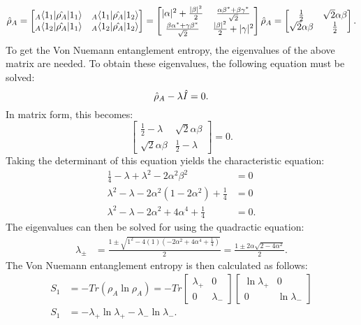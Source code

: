 \begin{equation}
\hat{\rho}_A = \begin{bmatrix} {}_A \langle 1_1 | \hat{\rho_A} | 1_1 \rangle & {}_A \langle 1_1 | \hat{\rho_A} | 1_2 \rangle \\ {}_A \langle 1_2 | \hat{\rho_A} | 1_1 \rangle & {}_A \langle 1_2 | \hat{\rho_A} | 1_2 \rangle \end{bmatrix} = \begin{bmatrix} |\alpha|^2 + \frac{|\beta|^2}{2} & \frac{\alpha \beta^* + \beta \gamma^*}{\sqrt{2}} \\ \frac{\beta \alpha^* + \gamma \beta^*}{\sqrt{2}} & \frac{|\beta|^2}{2} + |\gamma|^2 \end{bmatrix} \\
\hat{\rho}_A = \begin{bmatrix} \frac{1}{2} & \sqrt{2} \alpha \beta \\ \sqrt{2} \alpha \beta & \frac{1}{2} \end{bmatrix}.
\end{equation}
\noindent To get the Von Nuemann entanglement entropy, the eigenvalues of the above matrix are needed. To obtain these eigenvalues, the following equation must be solved:
\begin{equation}
\hat{\rho}_A - \lambda \hat{I} = 0. \\
\end{equation}
\noindent In matrix form, this becomes:
\begin{equation}
\begin{bmatrix} \frac{1}{2} - \lambda & \sqrt{2} \alpha \beta \\ \sqrt{2} \alpha \beta & \frac{1}{2} - \lambda \end{bmatrix} = 0.
\end{equation}
\noindent Taking the determinant of this equation yields the characteristic equation:
\begin{align}
\frac{1}{4} - \lambda + \lambda^2 -2 \alpha^2 \beta^2 &= 0 \\
\lambda^2 - \lambda - 2 \alpha^2 \left( 1 - 2 \alpha^2 \right) + \frac{1}{4} &= 0 \\
\lambda^2 - \lambda - 2 \alpha^2 + 4 \alpha^4 + \frac{1}{4} &= 0.
\end{align}
\noindent The eigenvalues can then be solved for using the quadractic equation:
\begin{align}
\lambda_{\pm} &= \frac{1 \pm \sqrt{1^2 - 4 \left( 1 \right) \left( -2 \alpha^2 + 4 \alpha^4 + \frac{1}{4} \right) }}{2} = \frac{1 \pm 2 \alpha \sqrt{2 - 4 \alpha^2}}{2}.
\end{align}
\noindent The Von Nuemann entanglement entropy is then calculated as follows:
\begin{align}
S_1 &= -Tr \left( \rho_A \ln{\rho_A} \right) = -Tr \begin{bmatrix} \lambda_+ & 0 \\ 0 & \lambda_- \end{bmatrix} \begin{bmatrix} \ln{\lambda_+} & 0 \\ 0 & \ln{\lambda_-} \end{bmatrix} \\
S_1 &= -\lambda_+ \ln{\lambda_+} - \lambda_- \ln{\lambda_-}.
\end{align}